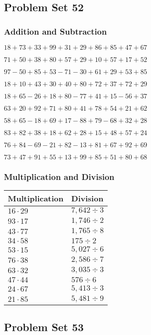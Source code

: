 \hypertarget{problem-set-52}{%
\subsection{Problem Set 52}\label{problem-set-52}}

\hypertarget{addition-and-subtraction-92}{%
\subsubsection{Addition and
Subtraction}\label{addition-and-subtraction-92}}

\(18+73+33+99+31+29+86+85+47+ 67\)

\(71+50+38+80+57+29+10+57+17+52\)

\(97-50+85+53-71-30+61+29+53+85\)

\(18+10+43+30+40+80+72+37+72+29\)

\(18+65-26+18+80-77+41+15-56+37\)

\(63+20+92+71+80+41+78+54+21+62\)

\(58+65-18+69+17-88+79-68+32+28\)

\(83+82+38+18+62+28+15+48+57+24\)

\(76+84-69-21+82-13+81+67+92+69\)

\(73+47+91+55+13+99+85+51+80+68\)

\hypertarget{multiplication-and-division-92}{%
\subsubsection{Multiplication and
Division}\label{multiplication-and-division-92}}

\begin{longtable}[]{@{}ll@{}}
\toprule
Multiplication & Division\tabularnewline
\midrule
\endhead
\(16\cdot29\) & \(7,642÷3\)\tabularnewline
\(93\cdot17\) & \(1,746÷2\)\tabularnewline
\(43\cdot77\) & \(1,765÷8\)\tabularnewline
\(34\cdot58\) & \(175÷2\)\tabularnewline
\(53\cdot15\) & \(5,027÷6\)\tabularnewline
\(76\cdot38\) & \(2,586÷7\)\tabularnewline
\(63\cdot32\) & \(3,035÷3\)\tabularnewline
\(47\cdot44\) & \(576÷6\)\tabularnewline
\(24\cdot67\) & \(5,413÷3\)\tabularnewline
\(21\cdot85\) & \(5,481÷9\)\tabularnewline
\bottomrule
\end{longtable}

\hypertarget{problem-set-53}{%
\subsection{Problem Set 53}\label{problem-set-53}}

